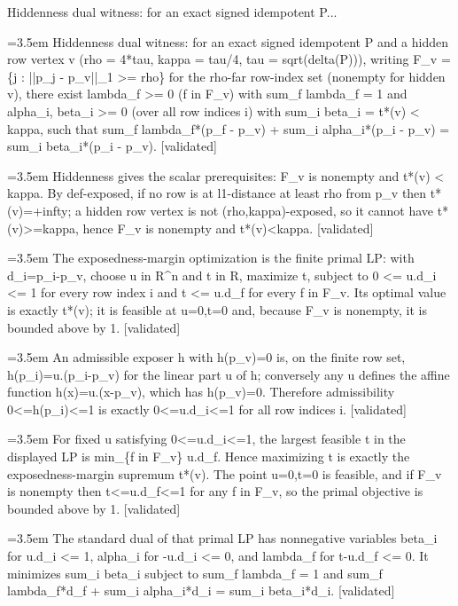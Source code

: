 \documentclass{article}
\newcommand{\step}[1]{\par\noindent\hangindent=3.5em\hangafter=1%
  \makebox[3.5em][l]{\textbf{#1.}}}
\newcommand{\steptag}[1]{\hfill{\small\textsf{[#1]}}}
\begin{document}
\begin{proofbox}{Hiddenness dual witness: for an exact signed idempotent P...}
\step{1} Hiddenness dual witness: for an exact signed idempotent P and a hidden row vertex v (rho = 4*tau, kappa = tau/4, tau = sqrt(delta(P))), writing F\_v = \{j : ||p\_j - p\_v||\_1 >= rho\} for the rho-far row-index set (nonempty for hidden v), there exist lambda\_f >= 0 (f in F\_v) with sum\_f lambda\_f = 1 and alpha\_i, beta\_i >= 0 (over all row indices i) with sum\_i beta\_i = t*(v) < kappa, such that sum\_f lambda\_f*(p\_f - p\_v) + sum\_i alpha\_i*(p\_i - p\_v) = sum\_i beta\_i*(p\_i - p\_v). \steptag{validated} \\[6pt]
\step{1.1} Hiddenness gives the scalar prerequisites: F\_v is nonempty and t*(v) < kappa. By def-exposed, if no row is at l1-distance at least rho from p\_v then t*(v)=+infty; a hidden row vertex is not (rho,kappa)-exposed, so it cannot have t*(v)>=kappa, hence F\_v is nonempty and t*(v)<kappa. \steptag{validated} \\[4pt]
\step{1.2} The exposedness-margin optimization is the finite primal LP: with d\_i=p\_i-p\_v, choose u in R\textasciicircum{}n and t in R, maximize t, subject to 0 <= u.d\_i <= 1 for every row index i and t <= u.d\_f for every f in F\_v. Its optimal value is exactly t*(v); it is feasible at u=0,t=0 and, because F\_v is nonempty, it is bounded above by 1. \steptag{validated} \\[6pt]
\step{1.2.1} An admissible exposer h with h(p\_v)=0 is, on the finite row set, h(p\_i)=u.(p\_i-p\_v) for the linear part u of h; conversely any u defines the affine function h(x)=u.(x-p\_v), which has h(p\_v)=0. Therefore admissibility 0<=h(p\_i)<=1 is exactly 0<=u.d\_i<=1 for all row indices i. \steptag{validated} \\[4pt]
\step{1.2.2} For fixed u satisfying 0<=u.d\_i<=1, the largest feasible t in the displayed LP is min\_\{f in F\_v\} u.d\_f. Hence maximizing t is exactly the exposedness-margin supremum t*(v). The point u=0,t=0 is feasible, and if F\_v is nonempty then t<=u.d\_f<=1 for any f in F\_v, so the primal objective is bounded above by 1. \steptag{validated} \\[4pt]
\step{1.3} The standard dual of that primal LP has nonnegative variables beta\_i for u.d\_i <= 1, alpha\_i for -u.d\_i <= 0, and lambda\_f for t-u.d\_f <= 0. It minimizes sum\_i beta\_i subject to sum\_f lambda\_f = 1 and sum\_f lambda\_f*d\_f + sum\_i alpha\_i*d\_i = sum\_i beta\_i*d\_i. \steptag{validated} \\[6pt]

\end{proofbox}
\end{document}
